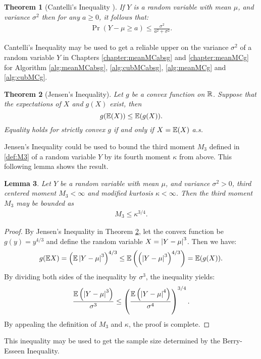 \documentclass{iitthesis}
\newtheorem{theorem}{Theorem}[section]
\newtheorem{lemma}[theorem]{Lemma}
\theoremstyle{definition}
\begin{document}

\begin{theorem}[Cantelli's Inequality {\cite[6.1.e]{LB10}}]\label{CanThm} If $Y$ is a random variable with mean $\mu$, and variance $\sigma^2$ then for any $a \geq 0$, it follows that: 
\begin{align}
\Pr(Y-\mu \ge a) \le  \frac{\sigma^2}{a^2+\sigma^2}.
\end{align}
\end{theorem}
Cantelli's Inequality may be used to get a reliable upper on the variance $\sigma^2$ of a random variable $Y$ in Chapters \ref{chapter:meanMCabsg} and \ref{chapter:meanMCg} for Algorithm \ref{alg:meanMCabsg}, \ref{alg:cubMCabsg}, \ref{alg:meanMCg} and \ref{alg:cubMCg}.


\begin{theorem}[Jensen's Inequality{\cite[8.4a]{LB10}}]\label{Jensen}
Let $g$ be a convex function on $\mathbb{R}$. Suppose that the expectations of $X$ and $g(X)$ exist, then
$$g(\mathbb{E}(X)) \leq \mathbb{E}(g(X)).$$
Equality holds for strictly convex $g$ if and only if $X=\mathbb{E}(X)$ a.s.
\end{theorem}
Jensen's Inequality could be used to bound the third moment $M_3$ defined in \eqref{def:M3} of a random variable $Y$ by its fourth moment $\kappa$ from above. This following lemma shows the result.
\begin{lemma}\label{M3kappalemma}
Let $Y$ be a random variable with mean $\mu$, and variance $\sigma^2>0$, third centered moment $M_3 < \infty$ and modified kurtosis $\kappa < \infty$. Then the third moment $M_3$ may be bounded as 
\begin{align}\label{M3kappa}
M_3\leq \kappa^{3/4}.
\end{align}
\end{lemma}
\begin{proof}
By Jensen's Inequality in Theorem \ref{Jensen}, let the convex function be $g(y) = y^{4/3}$ and define the random variable $X = \left \lvert Y-\mu \right \rvert^3$. Then we have:
$$g(\mathbb{E} X) = \left (\mathbb{E}\left \lvert Y-\mu \right \rvert^3\right)^{4/3} \leq \mathbb{E}\left(\left(\left \lvert Y-\mu \right \rvert^3\right)^{4/3}\right) = \mathbb{E}(g(X)).$$
By dividing both sides of the inequality by $\sigma^3$, the inequality yields:
$$\frac{\mathbb{E}\left(\left \lvert Y-\mu \right \rvert^3\right)}{\sigma^3} \leq \left (\frac{\mathbb{E}\left(\left \lvert Y-\mu \right \rvert^4\right)}{\sigma^4}\right)^{3/4}.$$
By appealing the definition of $M_3$ and $\kappa$, the proof is complete.
\end{proof}
This inequality may be used to get the sample size determined by the Berry-Esseen Inequality.
\end{document}
